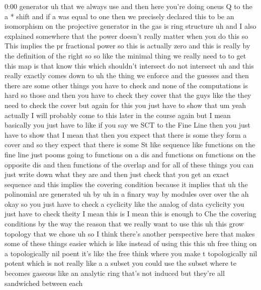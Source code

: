 \begin{unfinished}{0:00}
generator  uh  that  we  always
use  and  then  here  you're  doing  oneus  Q
to  the  a  *
shift  and  if  a  was  equal  to  one  then  we
precisely  declared  this  to  be  an
isomorphism  on  the  projective  generator
in  the  gas  is  ring  structure  uh  and  I
also  explained  somewhere  that  the  power
doesn't  really  matter  when  you  do  this
so  This  implies  the  pr  fractional  power
so  this  is  actually
zero  and  this  is  really  by  the
definition  of
the
right  so  so  like  the  minimal  thing  we
really  need  to  to  get  this  map  is  that
know  this  which  shouldn't  intersect  do
not  intersect  uh  and  this  really  exactly
comes  down  to  uh  the  thing  we  enforce
and  the
guesses  and  then  there  are  some  other
things  you  have  to  check
and  none  of  the  computations  is
hard
so  those  and  then  you  have  to  check  they
cover  that  the  guys  like  the  they  need
to  check  the  cover  but  again  for  this
you  just  have  to  show  that
um  yeah  actually  I  will  probably  come  to
this  later  in  the  course  again  but  I
mean  basically  you  just  have  to  like  if
you  say  we  SCT  to  the  Fine
Line  then  you  just  have  to  show  that  I
mean  that
then  you  expect  that  there  is  some  they
form  a  cover  and  so  they  expect  that
there  is  some  St  like  sequence  like
functions  on  the  fine  line  just
pooms  going  to  functions  on  a  dis  and
functions  on  functions  on  the  opposite
dis  and  then  functions  of  the  overlap
and  for  all  of  these  things  you  can  just
write  down  what  they  are  and  then  just
check  that  you  get  an  exact  sequence  and
this  implies  the  covering  condition
because  it  implies  that  uh  the
polinomial  are
generated  uh  by
uh  in  a  finary  way  by  modules  over  over
the  ah  okay  so  you  just  have  to  check  a
cyclicity  like  the  analog  of  data
cyclicity  you  just  have  to  check  theity
I
mean  this  is  I  mean  this  is  enough  to
Che  the  covering  conditions  by  the  way
the  reason  that  we  really  want  to  use
this  uh  this  grow  topology  that  we  chose
uh  so  I  think  there's  another
perspective  here  that  makes  some  of
these  things  easier  which  is  like
instead  of  using  this  this  uh  free  thing
on  a  topologically  nil  poent  it's  like
the  free  think  where  you  make  t
topologically  nil  potent  which  is  not
really  like  a  a  subset  you  could  use  the
subset  where  te  becomes  gaseous  like  an
analytic  ring  that's  not  induced  but
they're  all  sandwiched  between  each

\end{unfinished}
